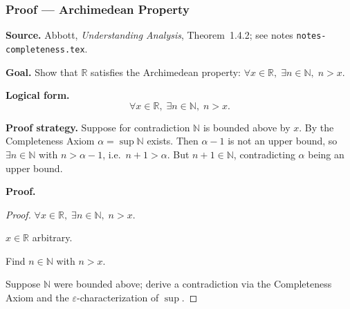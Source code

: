 
\clearpage
{}
\hypertarget{proof-RA-ABB-P-archimedean}{}

\subsubsection[Archimedean Property]{Proof --- Archimedean Property}

\bigskip

\noindent
\textbf{Source.}
Abbott, \emph{Understanding Analysis}, Theorem~1.4.2; see notes
\texttt{notes-completeness.tex}.

\vspace{0.75em}

\noindent
\textbf{Goal.}
Show that $\mathbb{R}$ satisfies the Archimedean property:
$\forall x \in \mathbb{R},\; \exists n \in \mathbb{N},\; n > x$.

\vspace{0.75em}

\noindent
\textbf{Logical form.}
\[
  \forall x \in \mathbb{R},\; \exists n \in \mathbb{N},\; n > x.
\]

\vspace{0.75em}

\noindent
\textbf{Proof strategy.}
Suppose for contradiction $\mathbb{N}$ is bounded above by $x$. By the
Completeness Axiom $\alpha = \sup \mathbb{N}$ exists. Then $\alpha - 1$
is not an upper bound, so $\exists n \in \mathbb{N}$ with $n > \alpha - 1$,
i.e.\ $n + 1 > \alpha$. But $n + 1 \in \mathbb{N}$, contradicting $\alpha$
being an upper bound.

\vspace{0.75em}

\noindent
\textbf{Proof.}
\begin{proof}
\Claim $\forall x \in \mathbb{R},\; \exists n \in \mathbb{N},\; n > x$.

\Given $x \in \mathbb{R}$ arbitrary.

\Goal Find $n \in \mathbb{N}$ with $n > x$.

\Strategy Suppose $\mathbb{N}$ were bounded above; derive a contradiction
via the Completeness Axiom and the $\varepsilon$-characterization of $\sup$.

\medskip





\end{proof}

